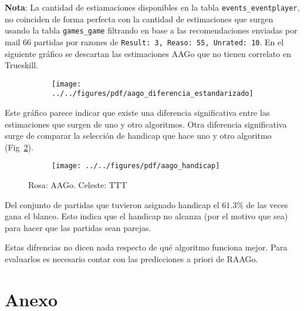 \documentclass[a4paper,10pt]{article}
\begin{document}
\textbf{Nota}: La cantidad de estiamaciones disponibles en la tabla \texttt{events\_eventplayer}, no coinciden de forma perfecta con la cantidad de estimaciones que surgen usando la tabla \texttt{games\_game} filtrando en base a las recomendaciones enviadas por mail 66 partidas por razones de \texttt{Result: 3, Reaso: 55, Unrated: 10}. En el siguiente gr\'afico se descartan las estimaciones AAGo que no tienen correlato en Trueskill.

 \begin{figure}[H]\centering
\begin{subfigure}[t]{0.66\textwidth}
\texttt{[image: ../../figures/pdf/aago\_diferencia\_estandarizado]} 
\end{subfigure}
\caption{}
\label{aago_diferencia_estandarizado}
\end{figure}

Este gr\'afico parece indicar que existe una diferencia significativa entre las estimaciones que surgen de uno y otro algoritmos.
Otra diferencia significativa surge de comparar la selecci\'on de handicap que hace uno y otro algoritmo (Fig~\ref{aago_handicap}). 

\begin{figure}[H]\centering
\begin{subfigure}[t]{0.66\textwidth}
\texttt{[image: ../../figures/pdf/aago\_handicap]} 
\end{subfigure}
\caption{Rosa: AAGo. Celeste: TTT}
\label{aago_handicap}
\end{figure}

Del conjunto de partidas que tuvieron asignado handicap el $61.3\%$ de las veces gana el blanco.
Esto indica que el handicap no alcanza (por el motivo que sea) para hacer que las partidas sean parejas.

\vspace{0.3cm}

Estas difrencias no dicen nada respecto de qu\'e algoritmo funciona mejor.
Para evaluarlos es necesario contar con las predicciones a priori de RAAGo.

\newpage

\section{Anexo}
\end{document}
